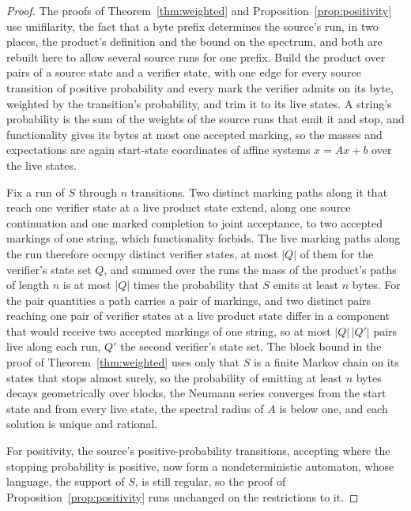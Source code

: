 \documentclass[11pt,a4paper]{article}
\theoremstyle{definition}
\theoremstyle{plain}
\begin{document}
\begin{proof}
The proofs of Theorem~\ref{thm:weighted} and Proposition~\ref{prop:positivity} use unifilarity, the fact that a byte
prefix determines the source's run, in two places, the product's definition and the bound on the spectrum, and both are
rebuilt here to allow several source runs for one prefix. Build the product over pairs of a source state and a verifier
state, with one edge for every source transition of positive probability and every mark the verifier admits on its byte,
weighted by the transition's probability, and trim it to its live states. A string's probability is the sum of the
weights of the source runs that emit it and stop, and functionality gives its bytes at most one accepted marking, so the
masses and expectations are again start-state coordinates of affine systems $x = Ax + b$ over the live states.

Fix a run of $S$ through $n$ transitions. Two distinct marking paths along it that reach one verifier state at a live
product state extend, along one source continuation and one marked completion to joint acceptance, to two accepted
markings of one string, which functionality forbids. The live marking paths along the run therefore occupy distinct
verifier states, at most $|Q|$ of them for the verifier's state set $Q$, and summed over the runs the mass of the
product's paths of length $n$ is at most $|Q|$ times the probability that $S$ emits at least $n$ bytes. For the pair
quantities a path carries a pair of markings, and two distinct pairs reaching one pair of verifier states at a live
product state differ in a component that would receive two accepted markings of one string, so at most $|Q|\,|Q'|$ pairs
live along each run, $Q'$ the second verifier's state set. The block bound in the proof of Theorem~\ref{thm:weighted}
uses only that $S$ is a finite Markov chain on its states that stops almost surely, so the probability of emitting at
least $n$ bytes decays geometrically over blocks, the Neumann series converges from the start state and from every live
state, the spectral radius of $A$ is below one, and each solution is unique and rational.

For positivity, the source's positive-probability transitions, accepting where the stopping probability is positive, now
form a nondeterministic automaton, whose language, the support of $S$, is still regular, so the proof of
Proposition~\ref{prop:positivity} runs unchanged on the restrictions to it.
\end{proof}
\end{document}
